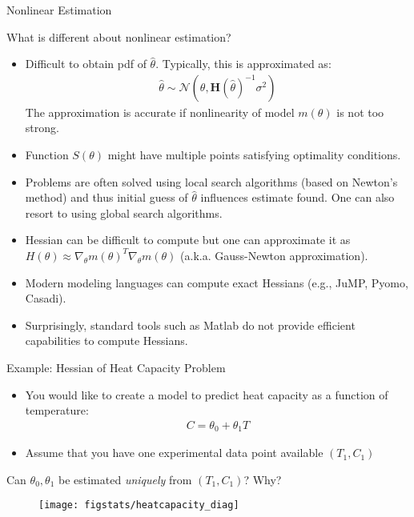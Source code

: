 \documentclass[9pt]{beamer}
\begin{document}
%
\begin{frame}{Nonlinear Estimation}

What is different about nonlinear estimation?
\begin{itemize}
\setlength{\itemsep}{10pt}
\item  Difficult to obtain pdf of $\hat{\theta}$. Typically, this is approximated as:
\begin{align*}
\hat{\theta}\sim\mathcal{N}(\theta,\mathbf{H}(\hat{\theta})^{-1}\sigma^2)
\end{align*}
The approximation is accurate if nonlinearity of model $m(\theta)$ is not too strong. 
\item Function $S(\theta)$ might have multiple points satisfying optimality conditions.  
\item Problems are often solved using local search algorithms (based on Newton's method) and thus initial guess of $\hat{\theta}$ influences estimate found.  One can also resort to using global search algorithms. 
\item Hessian can be difficult to compute but one can approximate it as $H(\theta)\approx \nabla_\theta m(\theta)^T\nabla_\theta m(\theta)$ (a.k.a. Gauss-Newton approximation).
\item Modern modeling languages can compute exact Hessians (e.g., JuMP, Pyomo, Casadi). 
\item Surprisingly, standard tools such as Matlab do not provide efficient capabilities to compute Hessians. 
\end{itemize}
\end{frame}

%
\begin{frame}{Example: Hessian of Heat Capacity Problem}

\begin{itemize}
\item You would like to create a model to predict heat capacity as a function of temperature:
\begin{align*}
C=\theta_0+\theta_1 T
\end{align*}
\item Assume that you have one experimental data point available $(T_1,C_1)$
\end{itemize}
\begin{block}{}
\begin{center}
Can $\theta_0,\theta_1$ be estimated {\em uniquely} from $(T_1,C_1)$? Why? 
\end{center}
\end{block}
\pause
\begin{figure}[!htb]
    \centering
	\texttt{[image: figstats/heatcapacity\_diag]}
\end{figure}

\end{frame}
\end{document}

